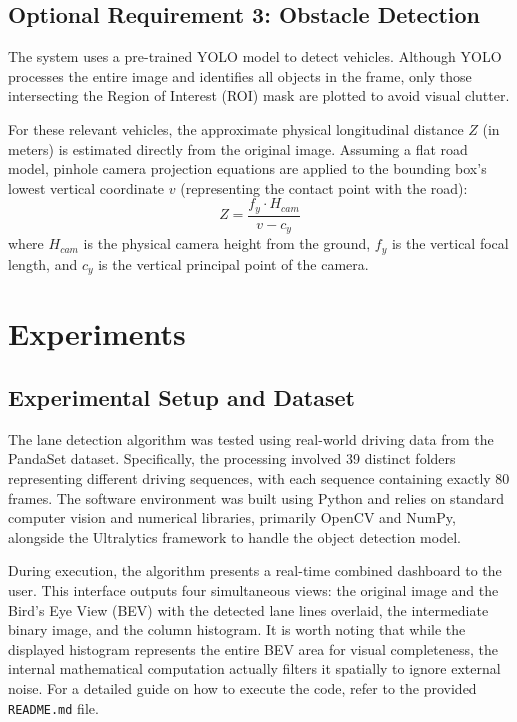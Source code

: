 \documentclass[12pt,a4paper]{article}
\begin{document}
\subsection{Optional Requirement 3: Obstacle Detection}
The system uses a pre-trained YOLO model to detect vehicles. Although YOLO processes the entire image and identifies all objects in the frame, only those intersecting the Region of Interest (ROI) mask are plotted to avoid visual clutter.

For these relevant vehicles, the approximate physical longitudinal distance $Z$ (in meters) is estimated directly from the original image. Assuming a flat road model, pinhole camera projection equations are applied to the bounding box's lowest vertical coordinate $v$ (representing the contact point with the road):
\begin{equation}
    Z = \frac{f_y \cdot H_{cam}}{v - c_y}
\end{equation}
where $H_{cam}$ is the physical camera height from the ground, $f_y$ is the vertical focal length, and $c_y$ is the vertical principal point of the camera.

\section{Experiments}

\subsection{Experimental Setup and Dataset}
The lane detection algorithm was tested using real-world driving data from the PandaSet dataset. Specifically, the processing involved 39 distinct folders representing different driving sequences, with each sequence containing exactly 80 frames. The software environment was built using Python and relies on standard computer vision and numerical libraries, primarily OpenCV and NumPy, alongside the Ultralytics framework to handle the object detection model.

During execution, the algorithm presents a real-time combined dashboard to the user. This interface outputs four simultaneous views: the original image and the Bird's Eye View (BEV) with the detected lane lines overlaid, the intermediate binary image, and the column histogram. It is worth noting that while the displayed histogram represents the entire BEV area for visual completeness, the internal mathematical computation actually filters it spatially to ignore external noise. For a detailed guide on how to execute the code, refer to the provided \texttt{README.md} file.
\end{document}
